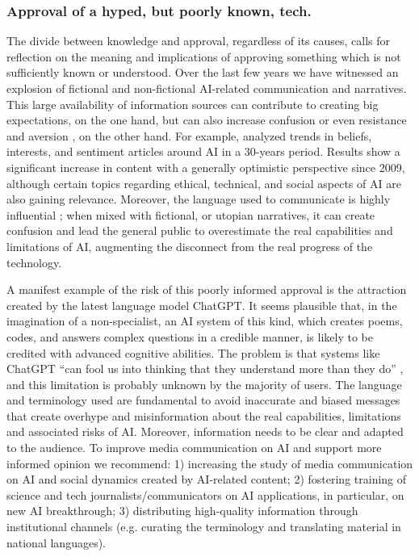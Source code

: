 \documentclass{article}
\begin{document}
\subsubsection{\textbf{Approval of a hyped, but poorly known, tech}.}
The divide between knowledge and approval, regardless of its causes, calls for reflection on the meaning and implications of approving something which is not sufficiently known or understood. Over the last few years we have witnessed an explosion of fictional and non-fictional AI-related communication and narratives. This large availability of information sources can contribute to creating big expectations, on the one hand, but can also increase confusion or even resistance and aversion \cite{longoni2019resistance, dietvorst2015algorithm}, on the other hand. For example, \cite{10.5555/3298239.3298381} analyzed trends in beliefs, interests, and sentiment articles around AI in a 30-years period. Results show a significant increase in content with a generally optimistic perspective since 2009, although certain topics regarding ethical, technical, and social aspects of AI are also gaining relevance. 
Moreover, the language used to communicate is highly influential \cite{TRS}; when mixed with fictional, or utopian narratives, it can create confusion and lead the general public to overestimate the real capabilities and limitations of AI, augmenting the disconnect from the real progress of the technology. 

A manifest example of the risk of this poorly informed approval is the attraction created by the latest language model ChatGPT. It seems plausible that, in the imagination of a non-specialist, an AI system of this kind, which creates poems, codes, and answers complex questions in a credible manner, is likely to be credited with advanced cognitive abilities. The problem is that systems like ChatGPT ``can fool us into thinking that they understand more than they do'' \cite{chatGPT}, and this limitation is probably unknown by the majority of users. 
The language and terminology used are fundamental to avoid inaccurate and biased messages that create overhype and misinformation about the real capabilities, limitations and associated risks of AI. Moreover, information needs to be clear and adapted to the audience. 
To improve media communication on AI and support more informed opinion we recommend: 1) increasing the study of media communication on AI and social dynamics created by AI-related content; 2) fostering training of science and tech journalists/communicators on AI applications, in particular, on new AI breakthrough; 3) distributing high-quality information through institutional channels (e.g. curating the terminology and translating material in national languages).
\end{document}
